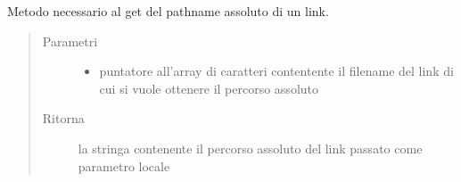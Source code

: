 \documentclass[letterpaper,10pt,italian,openany,oneside]{sphinxmanual}
\begin{document}

\begin{fulllineitems}
\label{\detokenize{documentazione:c.getLinkAbsPath}}
Metodo necessario al get del pathname assoluto di un link.
\begin{quote}\begin{description}
\item[{Parametri}] \leavevmode\begin{itemize}
\item {} 
 \textendash{} puntatore all’array di caratteri contentente il filename del link di cui si vuole ottenere il percorso assoluto

\end{itemize}

\item[{Ritorna}] \leavevmode
la stringa contenente il percorso assoluto del link passato come parametro locale

\end{description}\end{quote}

\end{fulllineitems}




\renewcommand{\indexname}{Indice}
\printindex
\end{document}
